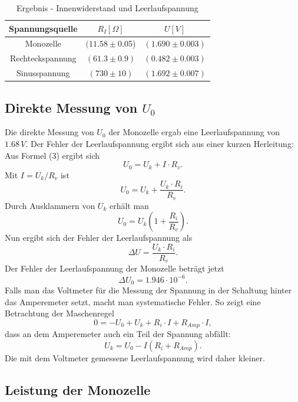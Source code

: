 \documentclass[11pt]{article}
\begin{document}
 \begin{table}[h]
 \centering
 \begin{tabular}{|c|c|c|}
  \hline
  Spannungsquelle & $R_I[\Omega]$ & $U[V]$ \\
  \hline
  Monozelle & $(11.58\pm$0.05) & $(1.690\pm0.003)$ \\
  Rechteckspannung & $(61.3\pm0.9)$& $(0.482\pm0.003)$ \\
  Sinusspannung & $(730\pm10)$ & $(1.692\pm0.007)$\\
  \hline
 \end{tabular}
 \caption{Ergebnis - Innenwiderstand und Leerlaufspannung}
 \label{Ergebnis}
 \end{table}

\subsection{Direkte Messung von $U_0$}
Die direkte Messung von $U_0$ der Monozelle ergab eine Leerlaufspannung von $1.68\, V$. Der Fehler der Leerlaufspannung ergibt sich aus einer kurzen Herleitung:\newline
Aus Formel (3) ergibt sich
\[ U_0 = U_k + I \cdot R_v. \]
Mit $I=U_k / R_v$ ist
\[ U_0 = U_k + \frac{U_k \cdot R_i}{R_v}.\]
Durch Ausklammern von $U_k$ erhält man
\[ U_0 = U_k \left( 1+\frac{R_i}{R_v}\right) .\]
Nun ergibt sich der Fehler der Leerlaufspannung als
\[ \Delta U = \frac{U_k \cdot R_i}{R_v}. \]
Der Fehler der Leerlaufspannung der Monozelle beträgt jetzt
\[ \Delta U_0 = 1.946 \cdot 10^{-6}.\]
\newline
Falls man das Voltmeter für die Messung der Spannung in der Schaltung hinter das Amperemeter setzt, macht man systematische Fehler. So zeigt eine Betrachtung der Maschenregel
\[ 0 = -U_0 + U_k + R_i \cdot I + R_{Amp} \cdot I ,\]
dass an dem Amperemeter auch ein Teil der Spannung abfällt:
\[ U_k = U_0 - I(R_i + R_{Amp}). \]
\newline
Die mit dem Voltmeter gemessene Leerlaufspannung wird daher kleiner.
\subsection{Leistung der Monozelle}
\end{document}
